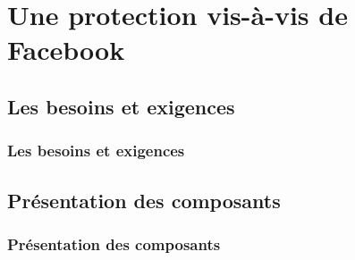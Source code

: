 \documentclass{beamer}
\begin{document}
\section{Une protection vis-à-vis de Facebook}

\subsection{Les besoins et exigences}
\begin{frame}
    \frametitle{Les besoins et exigences}
    \begin{block}{ }
    \end{block}
\end{frame}

\subsection{Présentation des composants}
\begin{frame}
    \frametitle{Présentation des composants}
    \begin{block}{ }
    \end{block}
\end{frame}
\end{document}
